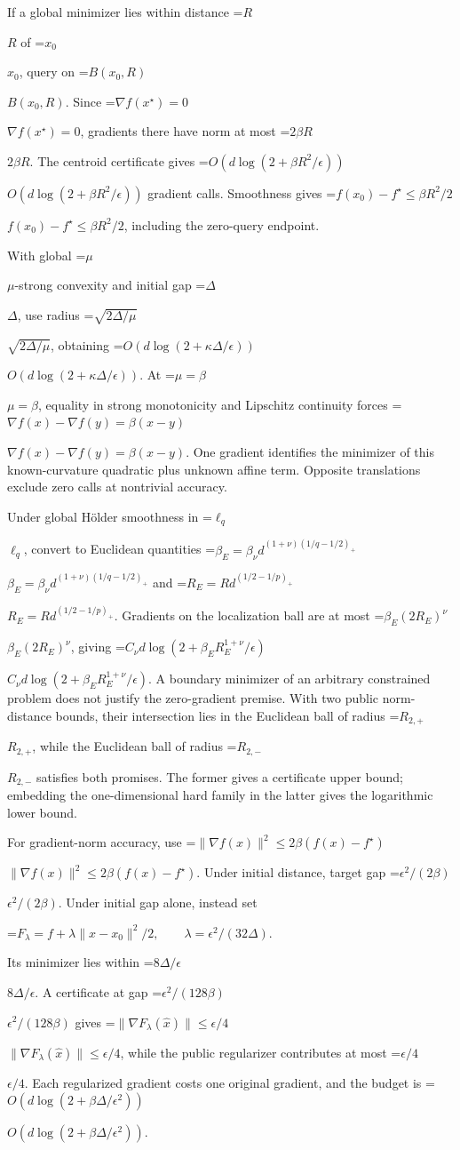 \documentclass[10pt,a4paper]{article}
\newcommand{\AtlasMath}[1]{\par\begingroup\centering\setbox0=\hbox{$\displaystyle #1$}\ifdim\wd0>1.4\linewidth\typeout{ATLAS WIDE FORMULA: \the\wd0}\fi\ifdim\wd0>\linewidth\resizebox{\linewidth}{!}{\box0}\else\box0\fi\par\endgroup}
\newcommand{\AtlasInlineMath}[1]{\begingroup\setbox0=\hbox{$#1$}\ifdim\wd0>.4\linewidth\endgroup\AtlasMath{#1}\else\endgroup$#1$\fi}
\begin{document}
If a global minimizer lies within distance \AtlasInlineMath{R} of \AtlasInlineMath{x_0}, query on \AtlasInlineMath{B(x_0,R)}. Since \AtlasInlineMath{\nabla f(x^\star)=0}, gradients there have norm at most \AtlasInlineMath{2\beta R}. The centroid certificate gives \AtlasInlineMath{O(d\log(2+\beta R^2/\epsilon))} gradient calls. Smoothness gives \AtlasInlineMath{f(x_0)-f^\star\le\beta R^2/2}, including the zero-query endpoint.

With global \AtlasInlineMath{\mu}-strong convexity and initial gap \AtlasInlineMath{\Delta}, use radius \AtlasInlineMath{\sqrt{2\Delta/\mu}}, obtaining \AtlasInlineMath{O(d\log(2+\kappa\Delta/\epsilon))}. At \AtlasInlineMath{\mu=\beta}, equality in strong monotonicity and Lipschitz continuity forces \AtlasInlineMath{\nabla f(x)-\nabla f(y)=\beta(x-y)}. One gradient identifies the minimizer of this known-curvature quadratic plus unknown affine term. Opposite translations exclude zero calls at nontrivial accuracy.

Under global Hölder smoothness in \AtlasInlineMath{\ell_q}, convert to Euclidean quantities
\AtlasInlineMath{\beta_E=\beta_\nu d^{(1+\nu)(1/q-1/2)_+}} and
\AtlasInlineMath{R_E=Rd^{(1/2-1/p)_+}}. Gradients on the localization ball are at most \AtlasInlineMath{\beta_E(2R_E)^\nu}, giving
\AtlasInlineMath{C_\nu d\log(2+\beta_E R_E^{1+\nu}/\epsilon)}.
A boundary minimizer of an arbitrary constrained problem does not justify the zero-gradient premise. With two public norm-distance bounds, their intersection lies in the Euclidean ball of radius \AtlasInlineMath{R_{2,+}}, while the Euclidean ball of radius \AtlasInlineMath{R_{2,-}} satisfies both promises. The former gives a certificate upper bound; embedding the one-dimensional hard family in the latter gives the logarithmic lower bound.

For gradient-norm accuracy, use \AtlasInlineMath{\|\nabla f(x)\|^2\le2\beta(f(x)-f^\star)}. Under initial distance, target gap \AtlasInlineMath{\epsilon^2/(2\beta)}. Under initial gap alone, instead set

\AtlasMath{F_\lambda=f+\lambda\|x-x_0\|^2/2,\qquad\lambda=\epsilon^2/(32\Delta).}

Its minimizer lies within \AtlasInlineMath{8\Delta/\epsilon}. A certificate at gap \AtlasInlineMath{\epsilon^2/(128\beta)} gives \AtlasInlineMath{\|\nabla F_\lambda(\widehat x)\|\le\epsilon/4}, while the public regularizer contributes at most \AtlasInlineMath{\epsilon/4}. Each regularized gradient costs one original gradient, and the budget is \AtlasInlineMath{O(d\log(2+\beta\Delta/\epsilon^2))}.
\end{document}
